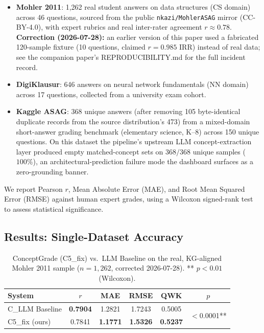 \documentclass[journal,review]{vgtc}
\begin{document}
\begin{itemize}
  \item \textbf{Mohler 2011}: 1{,}262 real student answers on data structures (CS domain) across 46 questions, sourced from the public \texttt{nkazi/MohlerASAG} mirror (CC-BY-4.0), with expert rubrics and real inter-rater agreement $r \approx 0.78$. \textbf{Correction (2026-07-28):} an earlier version of this paper used a fabricated 120-sample fixture (10 questions, claimed $r=0.985$ IRR) instead of real data; see the companion paper's REPRODUCIBILITY.md for the full incident record.
  \item \textbf{DigiKlausur}: 646 answers on neural network fundamentals (NN domain) across 17 questions, collected from a university exam cohort.
  \item \textbf{Kaggle ASAG}: 368 unique answers (after removing 105 byte-identical duplicate records from the source distribution's 473) from a mixed-domain short-answer grading benchmark (elementary science, K--8) across 150 unique questions. On this dataset the pipeline's upstream LLM concept-extraction layer produced empty matched-concept sets on $368/368$ unique samples ($100\%$), an architectural-prediction failure mode the dashboard surfaces as a zero-grounding banner.
\end{itemize}

We report Pearson $r$, Mean Absolute Error (MAE), and Root Mean Squared Error (RMSE) against human expert grades, using a Wilcoxon signed-rank test to assess statistical significance.

\subsection{Results: Single-Dataset Accuracy}

\begin{table}[ht]
\centering
\caption{ConceptGrade (C5\_fix) vs.\ LLM Baseline on the real, KG-aligned Mohler 2011 sample ($n=1{,}262$, corrected 2026-07-28). ** $p<0.01$ (Wilcoxon).}
\label{tab:mohler_accuracy}
\small
\begin{tabular}{lccccc}
\toprule
\textbf{System} & \textbf{$r$} & \textbf{MAE} & \textbf{RMSE} & \textbf{QWK} & \textbf{$p$} \\
\midrule
C\_LLM Baseline & \textbf{0.7904} & 1.2821 & 1.7243 & 0.5005 & \multirow{2}{*}{$<$0.0001**} \\
C5\_fix (ours) & 0.7841 & \textbf{1.1771} & \textbf{1.5326} & \textbf{0.5237} & \\
\bottomrule
\end{tabular}
\end{table}
\end{document}
